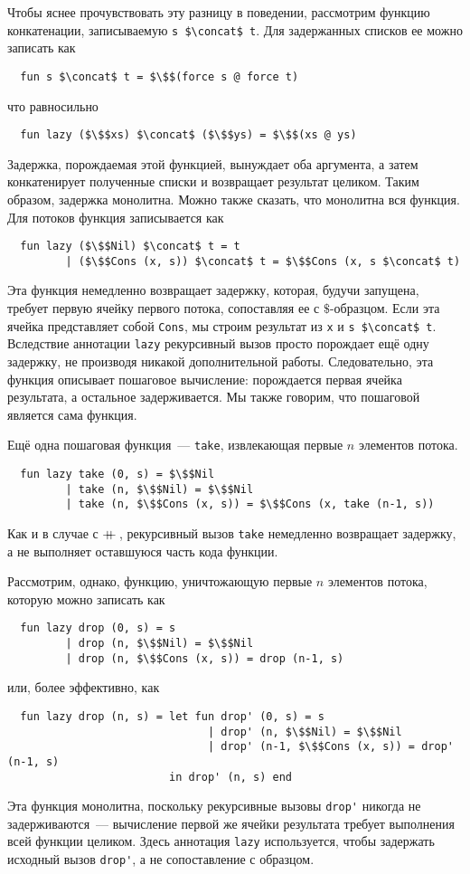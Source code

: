 Чтобы яснее прочувствовать эту разницу в поведении, рассмотрим функцию
конкатенации, записываемую \lstinline!s $\concat$ t!. Для задержанных
списков ее можно записать как
\begin{lstlisting}
  fun s $\concat$ t = $\$$(force s @ force t)
\end{lstlisting}
что равносильно
\begin{lstlisting}
  fun lazy ($\$$xs) $\concat$ ($\$$ys) = $\$$(xs @ ys)
\end{lstlisting}
Задержка, порождаемая этой функцией, вынуждает оба аргумента, а затем
конкатенирует полученные списки и возвращает результат целиком. Таким
образом, задержка монолитна. Можно также сказать, что монолитна вся
функция. Для потоков функция записывается как
\begin{lstlisting}
  fun lazy ($\$$Nil) $\concat$ t = t
         | ($\$$Cons (x, s)) $\concat$ t = $\$$Cons (x, s $\concat$ t)
\end{lstlisting}
Эта функция немедленно возвращает задержку, которая, будучи запущена,
требует первую ячейку первого потока, сопоставляя ее с
$\$$-образцом. Если эта ячейка представляет собой \lstinline!Cons!, мы
строим результат из \lstinline!x! и \lstinline!s $\concat$ t!.
Вследствие аннотации \lstinline!lazy! рекурсивный вызов просто
порождает ещё одну задержку, не производя никакой дополнительной
работы. Следовательно, эта функция описывает пошаговое вычисление:
порождается первая ячейка результата, а остальное задерживается. Мы
также говорим, что пошаговой является сама функция.

Ещё одна пошаговая функция~--- \lstinline!take!, извлекающая первые
$n$ элементов потока.
\begin{lstlisting}
  fun lazy take (0, s) = $\$$Nil
         | take (n, $\$$Nil) = $\$$Nil
         | take (n, $\$$Cons (x, s)) = $\$$Cons (x, take (n-1, s))
\end{lstlisting}
Как и в случае с $+\!\!\!+\,$, рекурсивный вызов \lstinline!take!
немедленно возвращает задержку, а не выполняет оставшуюся часть кода
функции.

Рассмотрим, однако, функцию, уничтожающую первые $n$ элементов потока,
которую можно записать как
\begin{lstlisting}
  fun lazy drop (0, s) = s
         | drop (n, $\$$Nil) = $\$$Nil
         | drop (n, $\$$Cons (x, s)) = drop (n-1, s)
\end{lstlisting}
или, более эффективно, как
\begin{lstlisting}
  fun lazy drop (n, s) = let fun drop' (0, s) = s
                               | drop' (n, $\$$Nil) = $\$$Nil
                               | drop' (n-1, $\$$Cons (x, s)) = drop' (n-1, s)
                         in drop' (n, s) end
\end{lstlisting}
Эта функция монолитна, поскольку рекурсивные вызовы \lstinline!drop'!
никогда не задерживаются~--- вычисление первой же ячейки результата
требует выполнения всей функции целиком. Здесь аннотация
\lstinline!lazy! используется, чтобы задержать исходный вызов
\lstinline!drop'!, а не сопоставление с образцом.

